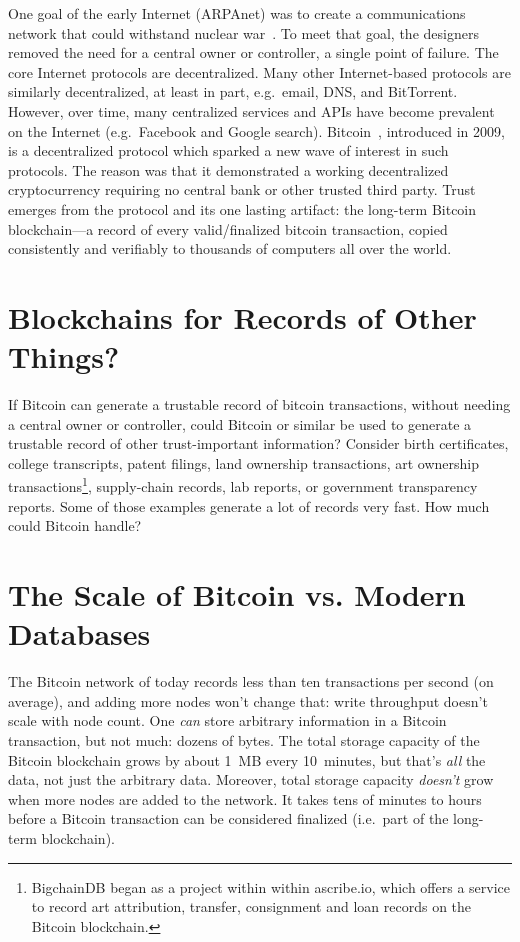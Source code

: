 \documentclass[a4paper]{article}
\begin{document}
One goal of the early Internet (ARPAnet) was to create a communications network
that could withstand nuclear war~\cite{arpanet_and_nuclear_war}.
To meet that goal, the designers removed the need for a central owner or
controller, a single point of failure.
The core Internet protocols are decentralized.
Many other Internet-based protocols are similarly decentralized,
at least in part, e.g.~email, DNS, and BitTorrent.
However, over time, many centralized services and APIs have become
prevalent on the Internet (e.g.~Facebook and Google search).
Bitcoin~\cite{nakamoto2009bitcoin}, introduced in 2009,
is a decentralized protocol
which sparked a new wave of interest in such protocols.
The reason was that it demonstrated a working decentralized cryptocurrency
requiring no central bank or other trusted third party.
Trust emerges from the protocol and its one lasting artifact:
the long-term Bitcoin blockchain---a record
of every valid/finalized bitcoin transaction,
copied consistently and verifiably to thousands
of computers all over the world.


\section{Blockchains for Records of Other Things?}

If Bitcoin can generate a trustable record of bitcoin transactions,
without needing a central owner or controller,
could Bitcoin or similar be used
to generate a trustable record of other trust-important information?
Consider
birth certificates,
college transcripts,
patent filings,
land ownership transactions,
art ownership transactions\footnote{BigchainDB
began as a project within within ascribe.io,
which offers a service to record art attribution, transfer,
consignment and loan records on the Bitcoin blockchain.},
supply-chain records,
lab reports,
or
government transparency reports.
Some of those examples
generate a lot of records very fast.
How much could Bitcoin handle?


\section{The Scale of Bitcoin vs. Modern Databases}

The Bitcoin network of today records less than ten transactions per second (on average),
and adding more nodes won't change that: write throughput doesn't scale with node count.
One \emph{can} store arbitrary information in a Bitcoin transaction,
but not much: dozens of bytes.
The total storage capacity of the Bitcoin blockchain grows
by about 1~MB every 10~minutes, but that's \emph{all} the data, not just the arbitrary data.
Moreover, total storage capacity \emph{doesn't} grow when more nodes are added to the network.
It takes tens of minutes to hours before a Bitcoin transaction can be considered finalized
(i.e.~part of the long-term blockchain).
\end{document}

